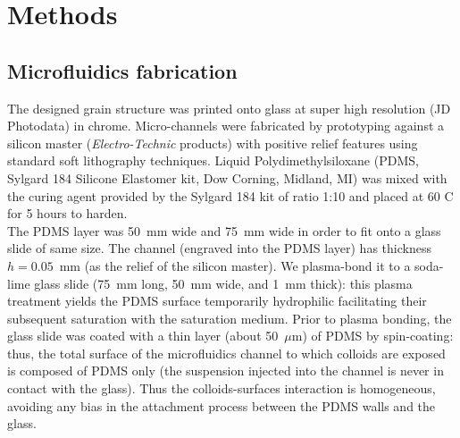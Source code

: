 \documentclass[singlecolumn,pre,notitlepage,preprintnumbers,floatfix,superscriptaddress]{revtex4-1}
\begin{document}
\noindent
\section{Methods}

\subsection*{Microfluidics fabrication}
\noindent
The designed grain structure was printed onto glass at super high resolution (JD Photodata) in chrome. Micro-channels were fabricated by prototyping against a silicon master (\emph{Electro-Technic} products) with positive relief features using standard soft lithography techniques. Liquid Polydimethylsiloxane (PDMS, Sylgard 184 Silicone Elastomer kit, Dow Corning, Midland, MI) was mixed with the curing agent provided by the Sylgard 184 kit of ratio 1:10 and placed at 60 \textdegree C for 5 hours to harden. \\

\noindent
The PDMS layer was 50~mm wide and 75~mm wide in order to fit onto a glass slide of same size. The channel (engraved into the PDMS layer) has thickness $h = 0.05$~mm (as the relief of the silicon master). We plasma-bond it to a soda-lime glass slide (75~mm long, 50~mm wide, and 1~mm thick): this plasma treatment yields the PDMS surface temporarily hydrophilic facilitating their subsequent saturation with the saturation medium. Prior to plasma bonding, the glass slide was coated with a thin layer (about 50~$\mu$m) of PDMS by spin-coating: thus, the total surface of the microfluidics channel to which colloids are exposed is composed of PDMS only (the suspension injected into the channel is never in contact with the glass). Thus the colloids-surfaces interaction is homogeneous, avoiding any bias in the attachment process between the PDMS walls and the glass. \\
\end{document}
